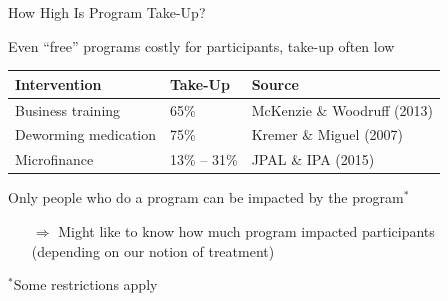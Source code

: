 \documentclass[10pt,xcolor=table,ignorenonframetext,aspectratio=169]{beamer}
\newlength{\wideitemsep}
\let\olditem\item
\renewcommand{\item}{\setlength{\itemsep}{\wideitemsep}\olditem}
\begin{document}

\begin{frame}{How High Is Program Take-Up?}

\medskip
Even ``free'' programs costly for participants, take-up often low

\begin{center}
	\begin{small}
		\begingroup
		\setlength{\tabcolsep}{10pt} %
		\renewcommand{\arraystretch}{1.6} %
		\begin{tabular}{lll}
			\hline \hline
			\textbf{Intervention}	& \textbf{Take-Up}	& \textbf{Source} \\ \hline
			Business training		& 65\%				& McKenzie \& Woodruff (2013) \\
			Deworming medication	& 75\%				& Kremer \& Miguel (2007) \\
			Microfinance			& 13\% -- 31\%			& JPAL \& IPA (2015) \\
			\hline
		\end{tabular}	
		\endgroup
	\end{small}
\end{center}

\medskip
Only people who do a program can be impacted by the program$^{\ast}$

\medskip
\begin{itemize}
	
	\item[$\Rightarrow$] Might like to know how much program impacted participants \\
	(depending on our notion of treatment)
	
\end{itemize}

\medskip
\medskip
\medskip
\footnotesize{$^{\ast}$Some restrictions apply}

\end{frame}


\end{document}
